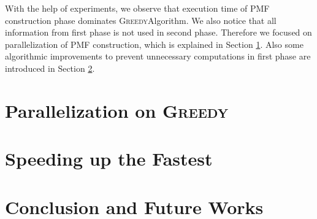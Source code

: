 \documentclass[12pt]{article}
\newcommand{\comment}[2]{{\color{red}{\bf (#1: #2)}}}
\newcommand{\greedyAlgo}{\textsc{Greedy}}
\begin{document}
With the help of experiments, we observe that execution time of PMF construction phase dominates \greedyAlgo \space Algorithm. We also notice that all information from first phase is not used in second phase. Therefore we focused on parallelization of PMF construction, which is explained in Section \ref{sec:parallel}. Also some algorithmic improvements to prevent unnecessary computations in first phase are introduced in Section \ref{sec:speedup}.

\clearpage
\section{Parallelization on \greedyAlgo}
\label{sec:parallel}



\clearpage
\section{Speeding up the Fastest}
\label{sec:speedup}
\comment{sertac}{Makalenin ismi guzel oldugu icin onu yazdim ama baska isim koymak gerekir mi emin olamadim.}



\clearpage
\section{Conclusion and Future Works}
\label{sec:conclusion}

\comment{sertac}{speeding up the fastest lookahead implementation'da hesapladigimiz merging sequencelari kaydetmiyoruz. onlari kaydederek giden bir algoritma daha hizli olabilir belki.}

\clearpage


\end{document}
